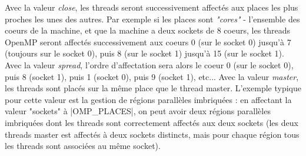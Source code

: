 Avec la valeur \emph{close}, les threads seront successivement affectés aux places les plus proches les unes des autres. Par exemple si les places sont \emph{"cores"} - l'ensemble des coeurs de la machine, et que la machine a deux sockets de 8 coeurs, les threads OpenMP seront affectés successivement aux coeurs 0 (sur le socket 0) jusqu'à 7 (toujours sur le socket 0), puis 8 (sur le socket 1) jusqu'à 15 (sur le socket 1).
Avec la valeur \emph{spread}, l'ordre d'affectation sera alors le coeur 0 (sur le socket 0), puis 8 (socket 1), puis 1 (socket 0), puis 9 (socket 1), etc...
Avec la valeur \emph{master}, les threads sont placés sur la même place que le thread master.
L'exemple typique pour cette valeur est la gestion de régions parallèles imbriquées : en affectant la valeur "sockets" à |OMP_PLACES|, on peut avoir deux régions parallèles imbriquées dont les threads sont correctement affectés aux deux sockets (les deux threads master est affectés à deux sockets distincts, mais pour chaque région tous les threads sont associées au même socket).


